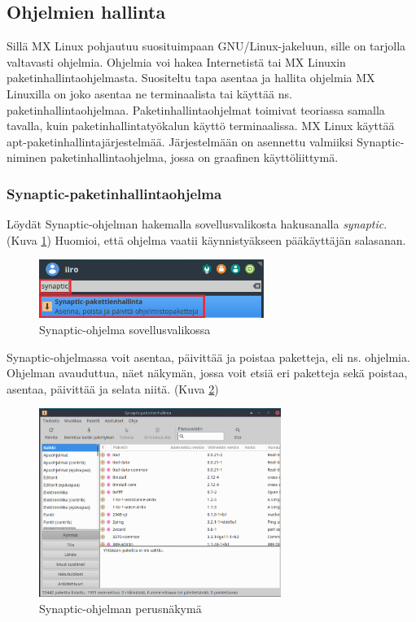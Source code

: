 \documentclass[a4paper, 12pt, finnish]{article}
\begin{document}
\subsection{Ohjelmien hallinta}
Sillä MX Linux pohjautuu suosituimpaan GNU/Linux-jakeluun, sille on tarjolla valtavasti ohjelmia. Ohjelmia voi hakea Internetistä tai MX Linuxin paketinhallintaohjelmasta.
Suositeltu tapa asentaa ja hallita ohjelmia MX Linuxilla on joko asentaa ne terminaalista tai käyttää ns. paketinhallintaohjelmaa.
Paketinhallintaohjelmat toimivat teoriassa samalla tavalla, kuin paketinhallintatyökalun käyttö terminaalissa. MX Linux käyttää apt-paketinhallintajärjestelmää. Järjestelmään on asennettu valmiiksi Synaptic-niminen paketinhallintaohjelma, jossa on graafinen käyttöliittymä.

\clearpage
\subsubsection{Synaptic-paketinhallintaohjelma}
Löydät Synaptic-ohjelman hakemalla sovellusvalikosta hakusanalla \textit{synaptic}.
(Kuva \ref{fig:synaptichaku})
Huomioi, että ohjelma vaatii käynnistyäkseen pääkäyttäjän salasanan.

\begin{figure}[htpb]
    \begin{center}
        \includegraphics[width=0.65\textwidth]{ymparisto/synaptic_haku}
        \caption{Synaptic-ohjelma sovellusvalikossa}
        \label{fig:synaptichaku}
    \end{center}
\end{figure}

Synaptic-ohjelmassa voit asentaa, päivittää ja poistaa paketteja, eli ns. ohjelmia. Ohjelman avauduttua, näet näkymän, jossa voit etsiä eri paketteja sekä poistaa, asentaa, päivittää ja selata niitä. (Kuva \ref{fig:syn_nak})

\begin{figure}[htpb]
    \begin{center}
        \includegraphics[width=0.7\textwidth]{ymparisto/synaptic_nakyma}
        \caption{Synaptic-ohjelman perusnäkymä}
        \label{fig:syn_nak}
    \end{center}
\end{figure}
\end{document}
